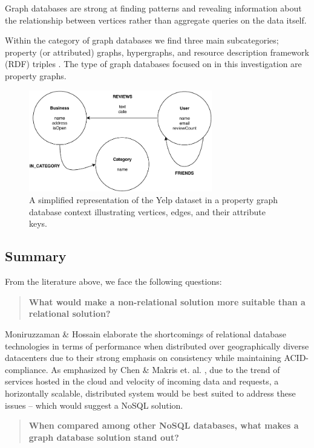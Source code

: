 Graph databases are strong at finding patterns and revealing information about the relationship between vertices rather than aggregate queries on the data itself.

Within the category of graph databases we find three main subcategories; property (or attributed) graphs, hypergraphs, and resource description framework (RDF) triples \cite{socialdata}. The type of graph databases focused on in this investigation are property graphs.

\begin{figure}[h]
    \centering
    \includegraphics[width=8cm]{img/graph-db.pdf}
    \caption{A simplified representation of the Yelp dataset in a property graph database context illustrating vertices, edges, and their attribute keys.}
    \label{fig:graph-db}
\end{figure}

\subsection{Summary}

From the literature above, we face the following questions:

\begin{quote}
    \textbf{What would make a non-relational solution more suitable than a relational solution?}
\end{quote}

Moniruzzaman \& Hossain \cite{nosql-db} elaborate the shortcomings of relational database technologies in terms of performance when distributed over geographically diverse datacenters due to their strong emphasis on consistency while maintaining ACID-compliance. As emphasized by Chen \cite{socialdata} \& Makris et. al. \cite{mongovspostgres}, due to the trend of services hosted in the cloud and velocity of incoming data and requests, a horizontally scalable, distributed system would be best suited to address these issues -- which would suggest a NoSQL solution.

\begin{quote}
    \textbf{When compared among other NoSQL databases, what makes a graph database solution stand out?}
\end{quote}

